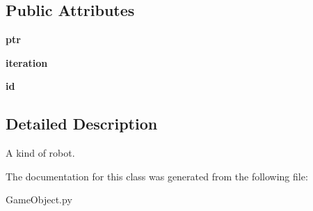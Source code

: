 \subsection*{Public Attributes}
\begin{DoxyCompactItemize}
\item 
\hypertarget{classGameObject_1_1Type_a9ad3b17633de07c109b9cde37c9192a9}{
{\bfseries ptr}}
\label{classGameObject_1_1Type_a9ad3b17633de07c109b9cde37c9192a9}

\item 
\hypertarget{classGameObject_1_1Type_adbe374e9663c0869e0e29650fd63323d}{
{\bfseries iteration}}
\label{classGameObject_1_1Type_adbe374e9663c0869e0e29650fd63323d}

\item 
\hypertarget{classGameObject_1_1Type_a49dc9726276a22fa48d21f06baa19275}{
{\bfseries id}}
\label{classGameObject_1_1Type_a49dc9726276a22fa48d21f06baa19275}

\end{DoxyCompactItemize}


\subsection{Detailed Description}
A kind of robot. 

The documentation for this class was generated from the following file:\begin{DoxyCompactItemize}
\item 
GameObject.py\end{DoxyCompactItemize}

